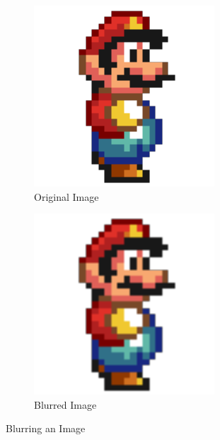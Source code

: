 \documentclass[a4paper,12pt]{article}
\begin{document}
\begin{figure}[H]
	\begin{subfigure}{0.5\textwidth}
		\centering
		\includegraphics[width=0.8\linewidth]{./original.png}
		\caption{Original Image}
		\label{fig:original}
	\end{subfigure}
	\begin{subfigure}{0.5\textwidth}
		\centering
		\includegraphics[width=0.8\linewidth]{./box blur.png}
		\caption{Blurred Image}
		\label{fig:box blurred}
	\end{subfigure}
	\caption{Blurring an Image}
\end{figure}
\end{document}
